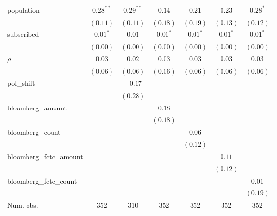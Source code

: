 \begin{table}[!h]
\begin{center}
\begin{tabular}{l c c c c c c }
population              & $0.28^{**}$  & $0.29^{**}$  & $0.14$       & $0.21$       & $0.23$       & $0.28^{*}$   \\
                        & $(0.11)$     & $(0.11)$     & $(0.18)$     & $(0.19)$     & $(0.13)$     & $(0.12)$     \\
subscribed              & $0.01^{*}$   & $0.01$       & $0.01^{*}$   & $0.01^{*}$   & $0.01^{*}$   & $0.01^{*}$   \\
                        & $(0.00)$     & $(0.00)$     & $(0.00)$     & $(0.00)$     & $(0.00)$     & $(0.00)$     \\
$\rho$                  & $0.03$       & $0.02$       & $0.03$       & $0.03$       & $0.03$       & $0.03$       \\
                        & $(0.06)$     & $(0.06)$     & $(0.06)$     & $(0.06)$     & $(0.06)$     & $(0.06)$     \\
pol\_shift              &              & $-0.17$      &              &              &              &              \\
                        &              & $(0.28)$     &              &              &              &              \\
bloomberg\_amount       &              &              & $0.18$       &              &              &              \\
                        &              &              & $(0.18)$     &              &              &              \\
bloomberg\_count        &              &              &              & $0.06$       &              &              \\
                        &              &              &              & $(0.12)$     &              &              \\
bloomberg\_fctc\_amount &              &              &              &              & $0.11$       &              \\
                        &              &              &              &              & $(0.12)$     &              \\
bloomberg\_fctc\_count  &              &              &              &              &              & $0.01$       \\
                        &              &              &              &              &              & $(0.19)$     \\
\midrule
Num. obs.               & 352          & 310          & 352          & 352          & 352          & 352          \\

\end{tabular}
\end{center}
\end{table}
